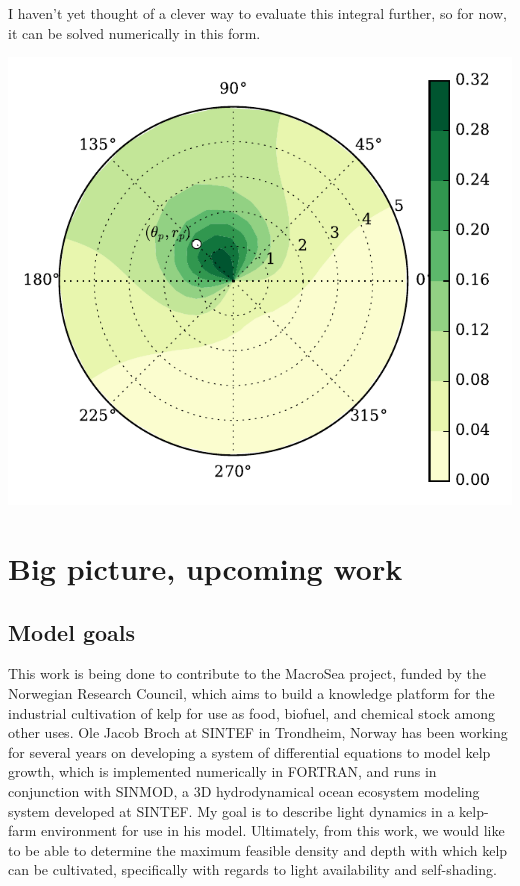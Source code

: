 \documentclass[10pt]{article}
\newenvironment{mcfig}
	{\par\medskip\noindent\minipage{\linewidth}}
	{\endminipage\par\medskip}
\begin{document}
\begin{multicols}{2}
I haven't yet thought of a clever way to evaluate this integral further, so for now, it can be solved numerically in this form.

\begin{mcfig}
	\centering
	\includegraphics[width=\linewidth]{prob_shade}
	\vspace{-2em}
	\label{fig:prob_shade}
\end{mcfig}

\section{Big picture, upcoming work}
\subsection{Model goals}
This work is being done to contribute to the MacroSea project, funded by the Norwegian Research Council, which aims to build a knowledge platform for the industrial cultivation of kelp for use as food, biofuel, and chemical stock among other uses.
Ole Jacob Broch at SINTEF in Trondheim, Norway has been working for several years on developing a system of differential equations to model kelp growth, which is implemented numerically in FORTRAN, and runs in conjunction with SINMOD, a 3D hydrodynamical ocean ecosystem modeling system developed at SINTEF.
My goal is to describe light dynamics in a kelp-farm environment for use in his model.
Ultimately, from this work, we would like to be able to determine the maximum feasible density and depth with which kelp can be cultivated, specifically with regards to light availability and self-shading.


\end{multicols}
\end{document}
